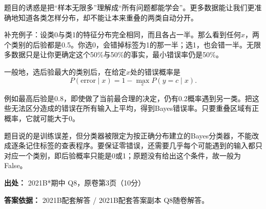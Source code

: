 题目的诱惑是把“样本无限多”理解成“所有问题都能学会”。更多数据能让我们更准确地知道各类怎样分布，却不能让本来重叠的两类自动分开。


补充例子：设类0与类1的特征分布完全相同，而且各占一半。那么看到任何\(x\)，两个类别的后验都是0.5。你选0，会错掉标签为1的那一半；选1，也会错一半。无限多数据只是让你更确定这个50\%与50\%的事实，最小错误率仍是50\%。


一般地，选后验最大的类别后，在给定\(x\)处的错误概率是
\[
P(\text{error}\mid x)=1-\max_c P(y=c\mid x).
\]


例如最高后验是0.8，即使做了当前最合理的决定，仍有0.2概率遇到另一类。把这些无法区分造成的错误在所有输入上平均，得到Bayes错误率。只要重叠区域有正概率，它就可能大于0。


题目说的是训练误差，但分类器被限定为按正确分布建立的Bayes分类器，不能改成逐条记住标签的查表程序。要保证零错误，还需要几乎每个可能遇到的输入都只对应一个类别，即后验概率只能是0或1；原题没有给出这个条件，故一般为False。


\textbf{出处：} 2021B*期中 Q8，原卷第3页（10分）


\textbf{答案依据：} 2021B配套解答 / 2021B配套答案副本 Q8随卷解答。
